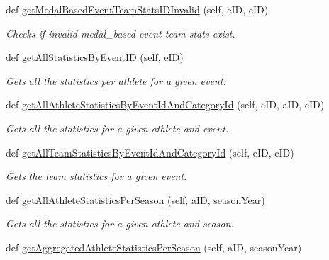 \begin{DoxyCompactItemize}
def \hyperlink{classhandler_1_1dao_1_1medal__based__event__dao_1_1_medal_based_event_d_a_o_a975bd0678f1ef745008c109f0bbc906c}{get\+Medal\+Based\+Event\+Team\+Stats\+I\+D\+Invalid} (self, e\+ID, c\+ID)
\begin{DoxyCompactList}\small\item\em Checks if invalid medal\+\_\+based event team stats exist. \end{DoxyCompactList}\item 
def \hyperlink{classhandler_1_1dao_1_1medal__based__event__dao_1_1_medal_based_event_d_a_o_ab30d66af48d9773136c2fc2e280e2d18}{get\+All\+Statistics\+By\+Event\+ID} (self, e\+ID)
\begin{DoxyCompactList}\small\item\em Gets all the statistics per athlete for a given event. \end{DoxyCompactList}\item 
def \hyperlink{classhandler_1_1dao_1_1medal__based__event__dao_1_1_medal_based_event_d_a_o_a8ceb90dc3affba4dc5c03639ff3ad2de}{get\+All\+Athlete\+Statistics\+By\+Event\+Id\+And\+Category\+Id} (self, e\+ID, a\+ID, c\+ID)
\begin{DoxyCompactList}\small\item\em Gets all the statistics for a given athlete and event. \end{DoxyCompactList}\item 
def \hyperlink{classhandler_1_1dao_1_1medal__based__event__dao_1_1_medal_based_event_d_a_o_a76a755e1f46f2109d7cfec243bd7f8d8}{get\+All\+Team\+Statistics\+By\+Event\+Id\+And\+Category\+Id} (self, e\+ID, c\+ID)
\begin{DoxyCompactList}\small\item\em Gets the team statistics for a given event. \end{DoxyCompactList}\item 
def \hyperlink{classhandler_1_1dao_1_1medal__based__event__dao_1_1_medal_based_event_d_a_o_a37ff4d0d13757e25f76268dc35a89f7c}{get\+All\+Athlete\+Statistics\+Per\+Season} (self, a\+ID, season\+Year)
\begin{DoxyCompactList}\small\item\em Gets all the statistics for a given athlete and season. \end{DoxyCompactList}\item 
def \hyperlink{classhandler_1_1dao_1_1medal__based__event__dao_1_1_medal_based_event_d_a_o_a3bb2f707a290025e37940e7731dba418}{get\+Aggregated\+Athlete\+Statistics\+Per\+Season} (self, a\+ID, season\+Year)

\end{DoxyCompactItemize}
